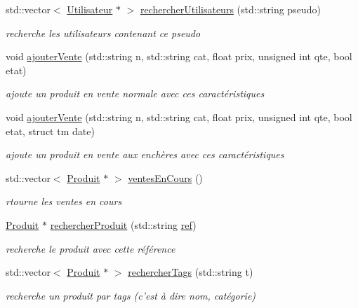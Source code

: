 \begin{DoxyCompactItemize}
std\-::vector$<$ \hyperlink{class_utilisateur}{Utilisateur} $\ast$ $>$ \hyperlink{class_gestion_bdd_a96636fecdc9750ebd4236b3c58aed84f}{rechercher\-Utilisateurs} (std\-::string pseudo)
\begin{DoxyCompactList}\small\item\em recherche les utilisateurs contenant ce pseudo \end{DoxyCompactList}\item 
void \hyperlink{class_gestion_bdd_ac8c3809d6de97f0e81cd5045a4a72c7e}{ajouter\-Vente} (std\-::string n, std\-::string cat, float prix, unsigned int qte, bool etat)
\begin{DoxyCompactList}\small\item\em ajoute un produit en vente normale avec ces caractéristiques \end{DoxyCompactList}\item 
void \hyperlink{class_gestion_bdd_af4e95573213751d5487464ff3e24cc98}{ajouter\-Vente} (std\-::string n, std\-::string cat, float prix, unsigned int qte, bool etat, struct tm date)
\begin{DoxyCompactList}\small\item\em ajoute un produit en vente aux enchères avec ces caractéristiques \end{DoxyCompactList}\item 
std\-::vector$<$ \hyperlink{class_produit}{Produit} $\ast$ $>$ \hyperlink{class_gestion_bdd_aa52e1f2d076c4e3f65162e9f28ed20fa}{ventes\-En\-Cours} ()
\begin{DoxyCompactList}\small\item\em rtourne les ventes en cours \end{DoxyCompactList}\item 
\hyperlink{class_produit}{Produit} $\ast$ \hyperlink{class_gestion_bdd_abf0ffd54c39d6dfe431fc8d556eb5c8d}{rechercher\-Produit} (std\-::string \hyperlink{class_gestion_bdd_ae9e26a2043f3e10fb773107809bfc007}{ref})
\begin{DoxyCompactList}\small\item\em recherche le produit avec cette référence \end{DoxyCompactList}\item 
std\-::vector$<$ \hyperlink{class_produit}{Produit} $\ast$ $>$ \hyperlink{class_gestion_bdd_aadc12bc0c3aee41bc56918e44b5d1085}{rechercher\-Tags} (std\-::string t)
\begin{DoxyCompactList}\small\item\em recherche un produit par tags (c'est à dire nom, catégorie) \end{DoxyCompactList}\end{DoxyCompactItemize}

